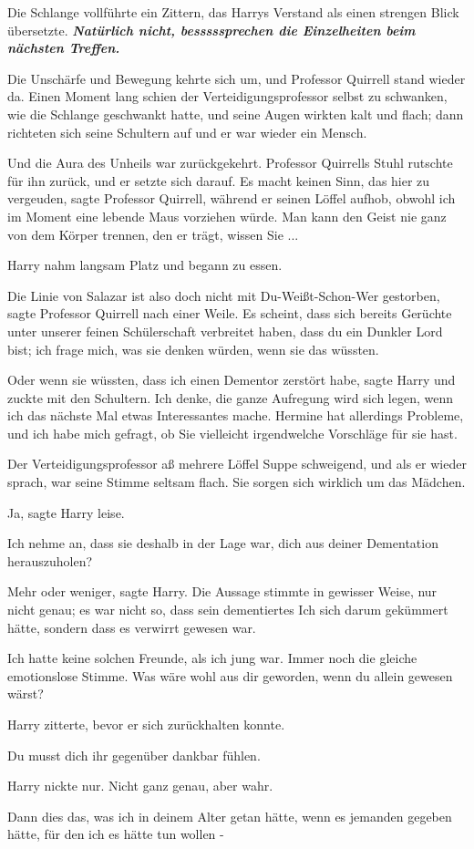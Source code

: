 Die Schlange vollführte ein Zittern, das Harrys Verstand als einen strengen
Blick übersetzte. \glqq{}\textbf{\emph{Natürlich nicht, besssssprechen die
Einzelheiten beim nächsten Treffen.}}\grqq{}

Die Unschärfe und Bewegung kehrte sich um, und Professor Quirrell stand wieder
da. Einen Moment lang schien der Verteidigungsprofessor selbst zu schwanken, wie
die Schlange geschwankt hatte, und seine Augen wirkten kalt und flach; dann
richteten sich seine Schultern auf und er war wieder ein Mensch.

Und die Aura des Unheils war zurückgekehrt. Professor Quirrells Stuhl rutschte
für ihn zurück, und er setzte sich darauf. \glqq{}Es macht keinen Sinn, das hier
zu vergeuden\grqq{}, sagte Professor Quirrell, während er seinen Löffel aufhob,
\glqq{}obwohl ich im Moment eine lebende Maus vorziehen würde. Man kann den Geist
nie ganz von dem Körper trennen, den er trägt, wissen Sie ...\grqq{}

Harry nahm langsam Platz und begann zu essen.

\glqq{}Die Linie von Salazar ist also doch nicht mit Du-Weißt-Schon-Wer
gestorben\grqq{}, sagte Professor Quirrell nach einer Weile. \glqq{}Es scheint,
dass sich bereits Gerüchte unter unserer feinen Schülerschaft verbreitet haben,
dass du ein Dunkler Lord bist; ich frage mich, was sie denken würden, wenn sie
das wüssten.\grqq{}

\glqq{}Oder wenn sie wüssten, dass ich einen Dementor zerstört habe\grqq{}, sagte
Harry und zuckte mit den Schultern. \glqq{}Ich denke, die ganze Aufregung wird
sich legen, wenn ich das nächste Mal etwas Interessantes mache. Hermine hat
allerdings Probleme, und ich habe mich gefragt, ob Sie vielleicht irgendwelche
Vorschläge für sie hast.\grqq{}

Der Verteidigungsprofessor aß mehrere Löffel Suppe schweigend, und als er wieder
sprach, war seine Stimme seltsam flach. \glqq{}Sie sorgen sich wirklich um das
Mädchen.\grqq{}

\glqq{}Ja\grqq{}, sagte Harry leise.

\glqq{}Ich nehme an, dass sie deshalb in der Lage war, dich aus deiner
Dementation herauszuholen?\grqq{}

\glqq{}Mehr oder weniger\grqq{}, sagte Harry. Die Aussage stimmte in gewisser
Weise, nur nicht genau; es war nicht so, dass sein dementiertes Ich sich darum
gekümmert hätte, sondern dass es verwirrt gewesen war.

\glqq{}Ich hatte keine solchen Freunde, als ich jung war.\grqq{} Immer noch die gleiche
emotionslose Stimme. \glqq{}Was wäre wohl aus dir geworden, wenn du allein
gewesen wärst?\grqq{}

Harry zitterte, bevor er sich zurückhalten konnte.

\glqq{}Du musst dich ihr gegenüber dankbar fühlen.\grqq{}

Harry nickte nur. Nicht ganz genau, aber wahr.

\glqq{}Dann dies das, was ich in deinem Alter getan hätte, wenn es jemanden
gegeben hätte, für den ich es hätte tun wollen -\grqq{}

